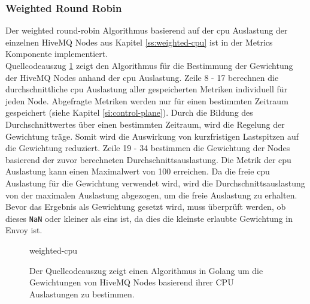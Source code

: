 \subsubsection{Weighted Round Robin}
Der weighted round-robin Algorithmus basierend auf der \ac{cpu} Auslastung der einzelnen HiveMQ Nodes aus Kapitel \ref{ss:weighted-cpu} ist in der Metrics Komponente implementiert.
\\
Quellcodeauszug \ref{code:weighted-cpu} zeigt den Algorithmus für die Bestimmung der Gewichtung der HiveMQ Nodes anhand der \ac{cpu} Auslastung.
Zeile 8 - 17 berechnen die durchschnittliche \ac{cpu} Auslastung aller gespeicherten Metriken individuell für jeden Node. Abgefragte Metriken werden nur für einen bestimmten Zeitraum gespeichert (siehe Kapitel \ref{si:control-plane}). Durch die Bildung des Durchschnittwertes über einen bestimmten Zeitraum, wird die Regelung der Gewichtung träge. Somit wird die Auswirkung von kurzfristigen Lastspitzen auf die Gewichtung reduziert.
Zeile 19 - 34 bestimmen die Gewichtung der Nodes basierend der zuvor berechneten Durchschnittsauslastung. Die Metrik der \ac{cpu} Auslastung kann einen Maximalwert von 100 erreichen. Da die freie \ac{cpu} Auslastung für die Gewichtung verwendet wird, wird die Durchschnittsauslastung von der maximalen Auslastung abgezogen, um die freie Auslastung zu erhalten. Bevor das Ergebnis als Gewichtung gesetzt wird, muss überprüft werden, ob dieses \verb|NaN| oder kleiner als eins ist, da dies die kleinste erlaubte Gewichtung in Envoy ist.
\begin{figure}
    {weighted-cpu}
    \caption{Der Quellcodeauszug zeigt einen Algorithmus in Golang um die Gewichtungen von HiveMQ Nodes basierend ihrer CPU Auslastungen zu bestimmen.}
    \label{code:weighted-cpu}
\end{figure}

